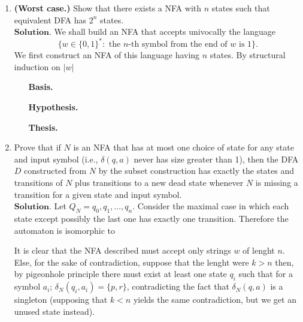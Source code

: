 \documentclass{article}
\theoremstyle{remark}
\begin{document}
\begin{enumerate}
    \item \textbf{(Worst case.)} Show that there exists a NFA with $n$ states such that equivalent DFA  
    has $2^n$ states.\\
    $\textbf{Solution.}$
    We shall build an NFA that accepts univocally the language
    \[
    \{w\in \{0,1\}^*: \text{ the } n\text{-th} \text{ symbol from the end of } w \text{ is } 1\}.
    \]
    We first construct an NFA of this language having $n$ states.
    By structural induction on $\vert w \vert$
    \begin{enumerate}
        \item[\textbf{Basis.}]
        \item[\textbf{Hypothesis.}]
        \item[\textbf{Thesis.}]
    \end{enumerate}

    \item Prove that if \( N \) is an NFA that has at most one choice of state for any state and input symbol (i.e., \(\delta(q, a)\) never has size greater than 1), 
    then the DFA \( D \) constructed from \( N \) by the subset construction has exactly the states and transitions of \( N \) plus transitions to a new dead state whenever \( N \) is missing a transition
    for a given state and input symbol.\\
    $\textbf{Solution.}$
    Let $Q_N = q_0, q_1, \dots, q_n$.
    Consider the maximal case in which each state except possibly the last one has exactly one transition.
    Therefore the automaton is isomorphic to
    \begin{center} 
    \end{center}
    It is clear that the NFA described must accept only strings $w$ of lenght $n$.
    Else, for the sake of contradiction, suppose that the lenght were $k > n$ then, by pigeonhole principle
    there must exist at least one state $q_i$ such that for a symbol $a_i$; $\delta_{N}(q_{i},a_i) = \{p,r\}$, contradicting the fact 
    that $\delta_N(q,a)$ is a singleton (supposing that $k<n$ yields the same contradiction, but we get an unused state instead).


\end{enumerate}
\end{document}
